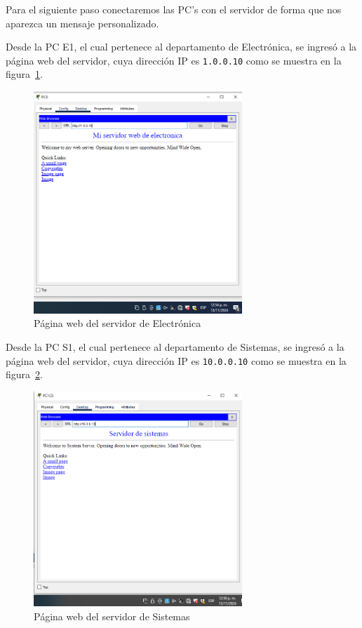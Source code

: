         Para el siguiente paso conectaremos las PC's con el servidor de forma que nos aparezca un mensaje personalizado.

        Desde la PC E1, el cual pertenece al departamento de Electrónica, se ingresó a la página web del servidor, cuya dirección IP es \texttt{1.0.0.10} como se muestra en la figura~\ref{fig:servidorElectronica}.


        \begin{figure}[H]
            \centering
            \includegraphics[width=0.7\textwidth]{img/serverElectronica.PNG}
            \caption{Página web del servidor de Electrónica}
            \label{fig:servidorElectronica}
        \end{figure}

        Desde la PC S1, el cual pertenece al departamento de Sistemas, se ingresó a la página web del servidor, cuya dirección IP es \texttt{10.0.0.10} como se muestra en la figura~\ref{fig:servidorSistemas}.

        \begin{figure}[H]
            \centering
            \includegraphics[width=0.7\textwidth]{img/Servidor de sistemas.PNG}
            \caption{Página web del servidor de Sistemas}
            \label{fig:servidorSistemas}
        \end{figure}

